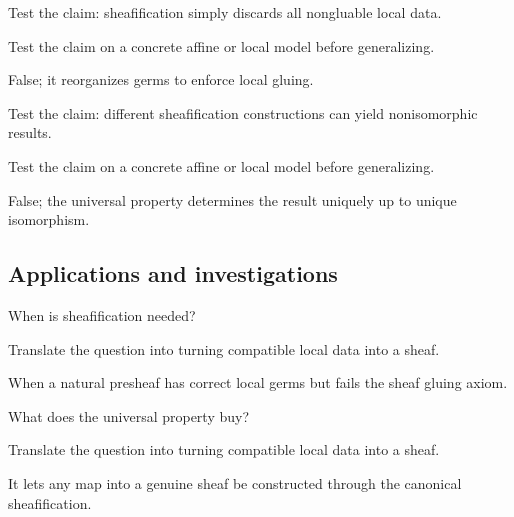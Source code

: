 \begin{exercise}\label{exr:vi14-expand-11}
Test the claim: sheafification simply discards all nongluable local data.
\end{exercise}
\begin{hint}
Test the claim on a concrete affine or local model before generalizing.
\end{hint}
\begin{solution}
False; it reorganizes germs to enforce local gluing.
\end{solution}

\begin{exercise}\label{exr:vi14-expand-12}
Test the claim: different sheafification constructions can yield nonisomorphic results.
\end{exercise}
\begin{hint}
Test the claim on a concrete affine or local model before generalizing.
\end{hint}
\begin{solution}
False; the universal property determines the result uniquely up to unique isomorphism.
\end{solution}

\subsection*{Applications and investigations}

\begin{exercise}\label{exr:vi14-expand-13}
When is sheafification needed?
\end{exercise}
\begin{hint}
Translate the question into turning compatible local data into a sheaf.
\end{hint}
\begin{solution}
When a natural presheaf has correct local germs but fails the sheaf gluing axiom.
\end{solution}

\begin{exercise}\label{exr:vi14-expand-14}
What does the universal property buy?
\end{exercise}
\begin{hint}
Translate the question into turning compatible local data into a sheaf.
\end{hint}
\begin{solution}
It lets any map into a genuine sheaf be constructed through the canonical sheafification.
\end{solution}


